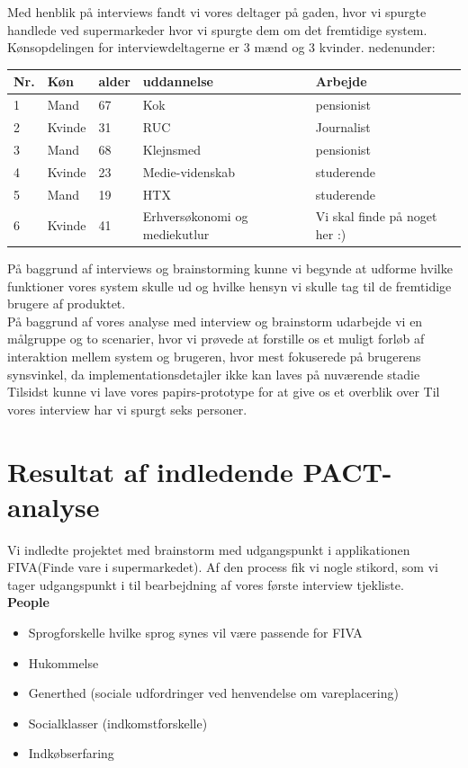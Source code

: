 \documentclass[12pt]{article}
\begin{document}
Med henblik på interviews fandt vi vores deltager på gaden, hvor vi spurgte handlede ved supermarkeder hvor vi spurgte dem om det fremtidige system.\\
Kønsopdelingen for interviewdeltagerne er 3 mænd og 3 kvinder. nedenunder:
\begin{center}
    \begin{tabular}{ |l | l | l | l | l |}
    \hline
    \textbf{Nr.} & \textbf{Køn} & \textbf{alder} & \textbf{uddannelse} & \textbf{Arbejde}\\ \hline
    1 & Mand & 67 & Kok & pensionist \\ \hline
    2 & Kvinde & 31 & RUC & Journalist \\ \hline
    3 & Mand & 68 & Klejnsmed & pensionist \\ \hline
    4 & Kvinde & 23 & Medie-videnskab & studerende \\ \hline
    5 & Mand & 19 & HTX & studerende \\ \hline
    6 & Kvinde & 41 & Erhversøkonomi og mediekutlur & Vi skal finde på noget her :) \\ \hline
     \end{tabular}
\end{center}
På baggrund af interviews og brainstorming kunne vi begynde at udforme hvilke funktioner vores system skulle ud og hvilke hensyn vi skulle tag til de fremtidige brugere af produktet.\\
På baggrund af vores analyse med interview og brainstorm udarbejde vi en målgruppe og to scenarier, hvor vi prøvede at forstille os et muligt forløb af interaktion mellem system og brugeren, hvor mest fokuserede på brugerens synsvinkel, da implementationsdetajler ikke kan laves på nuværende stadie\\
Tilsidst kunne vi lave vores papirs-prototype for at give os et overblik over
Til vores interview har vi spurgt seks personer. 
\newpage
\section{Resultat af indledende PACT-analyse}
Vi indledte projektet med brainstorm med udgangspunkt i applikationen FIVA(Finde vare i supermarkedet). Af den process fik vi nogle stikord, som vi tager udgangspunkt i til bearbejdning af vores første interview tjekliste.\\
 
\noindent \textbf{People}
\begin{itemize} 
\item Sprogforskelle hvilke sprog synes vil være passende for FIVA
\item Hukommelse 
\item Generthed (sociale udfordringer ved henvendelse om vareplacering)
\item Socialklasser (indkomstforskelle)
\item Indkøbserfaring
\end{itemize}
\end{document}
